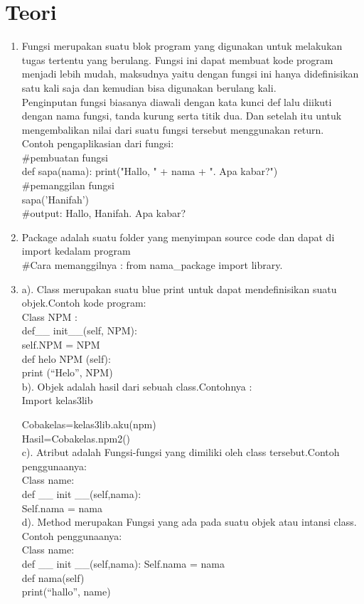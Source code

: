 \chapter*{Teori}

\begin{enumerate}
	\item Fungsi merupakan suatu blok program yang digunakan untuk melakukan tugas tertentu yang berulang. Fungsi ini dapat membuat kode program menjadi lebih mudah, maksudnya yaitu dengan fungsi ini hanya didefinisikan satu kali saja dan kemudian bisa  digunakan berulang kali.\\
    Penginputan fungsi biasanya diawali dengan kata kunci def lalu diikuti dengan nama fungsi, tanda kurung serta titik dua. Dan setelah itu untuk mengembalikan nilai dari suatu fungsi tersebut menggunakan return.\\
	Contoh pengaplikasian dari fungsi:\\
	\#pembuatan fungsi\\
	  def sapa(nama):  
        print("Hallo, " + nama + ". Apa kabar?")\\
	 \#pemanggilan fungsi \\ 
	    sapa('Hanifah')\\
	  \#output: Hallo, Hanifah. Apa kabar? \\
	
	\item Package adalah suatu folder yang menyimpan source code dan dapat di import kedalam program\\
	\#Cara memanggilnya : from nama\_package import library.
	
	\item a). Class merupakan suatu blue print  untuk  dapat mendefinisikan suatu objek.Contoh kode program: \\
	Class NPM :\\
	def\_\_ init\_\_(self, NPM):\\
		self.NPM = NPM\\
	def  helo NPM (self):\\
		print (“Helo”, NPM)\\
	b). Objek adalah hasil dari sebuah class.Contohnya :\\
	Import kelas3lib
	
	Cobakelas=kelas3lib.aku(npm)\\
 	Hasil=Cobakelas.npm2()\\
	c).	Atribut adalah  Fungsi-fungsi yang dimiliki oleh class tersebut.Contoh penggunaanya:\\
	Class name:\\
	def \_\_ init \_\_(self,nama):\\
	Self.nama = nama\\
	d). Method merupakan Fungsi yang ada pada suatu objek atau intansi class. Contoh penggunaanya:\\
	Class name:\\
	def \_\_ init \_\_(self,nama):
	Self.nama = nama\\
	def nama(self)\\
	print(“hallo”, name)\\
	

\end{enumerate}
